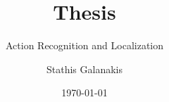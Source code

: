 \documentclass{beamer}
\title{Thesis}
\subtitle{Action Recognition and Localization}
\author{Stathis Galanakis}
\institute{National University of Athens}
\date{\today}
\begin{document}
\begin{frame}
\titlepage
\end{frame}
\end{document}
